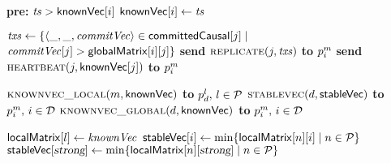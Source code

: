 \begin{algorithm}[t]
\begin{algorithmic}[1]
    \SpaceHandler

    \vspace{-1pt}

    \WhenRcv[\BHEARTBEAT($i$, $\ts$)]\label{line:heartbeatreceive}
      \State \textbf{pre:} $\ts > \replicavectorclock[i]$
      \State $\replicavectorclock[i] \gets \ts$
    \EndWhenRcv

    \SpaceHandler

    \vspace{-1pt}

    \label{line:forward}
           $\atxs \gets \{\langle \_, \_, \commitvector\rangle
            \in \committedset[j] \mid $\label{line:txstoforward}
          \Statex \hspace{3cm} $\commitvector[j]>\rvc[i][j]\}$
          \If{$\atxs \neq \emptyset$}
                  {\bf send}
                $\REPLICATE(j, \atxs)$
                \textbf{to} $\partition^m_i$
          \Else {}
            {\bf send}
              $\textsc{heartbeat}(j, {\sf knownVec}[j])$
              \textbf{to} $\partition^m_i$\label{line:heartbeatforward}
          \EndIf
    \EndFunction

    
    \SpaceHandler
    \vspace{-1pt}

    \Function{\CASTVC}{$ $}  \label{alg:line:bcast}
     $\textsc{knownvec\_local}(m, {\sf knownVec})$ 
    \textbf{to} $\partition^\areplica_d,\, \areplica \in \Partitions$ \label{alg:line:send-knownvc}
    $\textsc{stablevec}(d, {\sf stableVec})$ \textbf{to} $\partition^m_i,\, i \in \DC$\label{alg:line:updategsssend}
    $\textsc{knownvec\_global}(d, {\sf knownVec})$ \textbf{to} $\partition^m_i,\, i \in \DC$\label{line:updateglobalmatrixsend}
    \EndFunction

    \SpaceHandler
    \vspace{-1pt}

    \WhenRcv[\UPDCSS($\areplica$, $\areplicavectorclock$)] \label{alg:line:updategss}
      \State $\pmc[\areplica] \gets \areplicavectorclock$\label{alg:line:localknownmatrix}
        ${\sf stableVec}[i] \gets \min \{{\sf localMatrix}[n][i] \mid n \in \mathcal{P}\}$\label{line:computestable}
      \EndFor
      \State \colorbox{\BackColor}{{\color{\StrongColor}
          ${\sf stableVec}[\textsl{strong}]\gets \min\{{\sf localMatrix}[n][\textsl{strong}] \mid n \in \mathcal{P}\}$}}\label{line:stablered}
    \EndWhenRcv


\end{algorithmic}
\end{algorithm}

